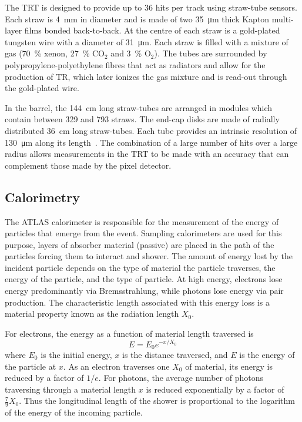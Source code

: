 The TRT is designed to provide up to \num{36} hits per track using straw-tube sensors. Each straw is \SI{4}{\mm} in diameter and is made of two \SI{35}{\micro\meter} thick Kapton multi-layer films bonded back-to-back. At the centre of each straw is a gold-plated tungsten wire with a diameter of \SI{31}{\micro\meter}. Each straw is filled with a mixture of gas (\SI{70}{\percent} xenon, \SI{27}{\percent} $\textrm{CO}_{2}$ and \SI{3}{\percent} $\textrm{O}_2$). The tubes are surrounded by polypropylene-polyethylene fibres that act as radiators and allow for the production of TR, which later ionizes the gas mixture and is read-out through the gold-plated wire.

In the barrel, the \SI{144}{\cm} long straw-tubes are arranged in modules which contain between \num{329} and \num{793} straws. The end-cap disks are made of radially distributed \SI{36}{\cm} long straw-tubes. Each tube provides an intrinsic resolution of \SI{130}{\um} along its length~\cite{Detector:ATLASExperimentGeneral}. The combination of a large number of hits over a large radius allows measurements in the TRT to be made with an accuracy that can complement those made by the pixel detector.

\subsection{Calorimetry}
The ATLAS calorimeter is responsible for the measurement of the energy of particles that emerge from the event. Sampling calorimeters are used for this purpose, layers of absorber material (passive) are placed in the path of the particles forcing them to interact and shower. The amount of energy lost by the incident particle depends on the type of material the particle traverses, the energy of the particle, and the type of particle. At high energy, electrons lose energy predominantly via Bremsstrahlung, while photons lose energy via pair production. The characteristic length associated with this energy loss is a material property known as the radiation length $X_0$.

For electrons, the energy as a function of material length traversed is
%
\begin{equation}
  E=E_0e^{-x/X_0}
\end{equation}
%
where $E_0$ is the initial energy, $x$ is the distance traversed, and $E$ is the energy of the particle at $x$. As an electron traverses one $X_0$ of material, its energy is reduced by a factor of $1/e$. For photons, the average number of photons traversing through a material length $x$ is reduced exponentially by a factor of $\frac{7}{9}X_0$. Thus the longitudinal length of the shower is proportional to the logarithm of the energy of the incoming particle.

